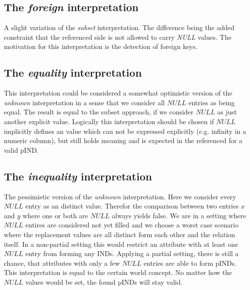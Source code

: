 \subsection*{The \textit{foreign} interpretation}
A slight variation of the \textit{subset} interpretation. The difference being the added constraint that the referenced side is not allowed to
carry \textit{NULL} values. The motivation for this interpretation is the detection of foreign keys.

\subsection*{The \textit{equality} interpretation}
This interpretation could be considered a somewhat optimistic version of the \textit{unknown} interpretation in a sense that we consider all $NULL$ entries as being equal. The result is equal to the subset approach, if we consider $NULL$ as just another explicit value. Logically this interpretation should be chosen if $NULL$ implicitly defines an value which can not be expressed explicitly (e.g. infinity in a numeric column), but still holds meaning and is expected in the referenced for a valid pIND.

\subsection*{The \textit{inequality} interpretation}
The pessimistic version of the \textit{unknown} interpretation. Here we consider every $NULL$ entry as an distinct value. Therefor the comparison between two entries $x$ and $y$ where one or both are $NULL$ always yields false. We are in a setting where $NULL$ entires are considered not yet filled and we choose a worst case scenario where the replacement values are all distinct form each other and the relation itself. In a non-partial setting this would restrict an attribute with at least one $NULL$ entry from forming any INDs. Applying a partial setting, there is still a chance, that attributes with only a few $NULL$ entries are able to form pINDs. \\

\noindent This interpretation is equal to the certain world concept. No matter how the $NULL$ values would be set, the found pINDs will stay valid.

